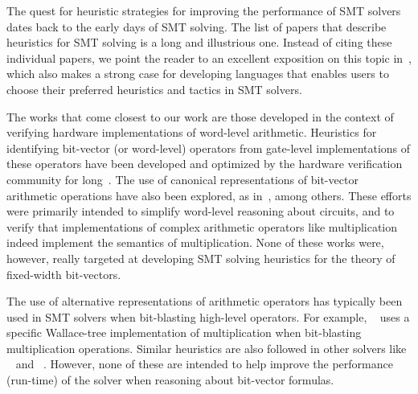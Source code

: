 


The quest for heuristic strategies for improving the performance of
SMT solvers dates back to the early days of SMT solving.  The list of
papers that describe heuristics for SMT solving is a long and
illustrious one.  Instead of citing these individual papers, we point
the reader to an excellent exposition on this topic
in~\cite{deMoura2013}, which also makes a strong case for developing
languages that enables users to choose their preferred heuristics and
tactics in SMT solvers.

The works that come closest to our work are those developed in the
context of verifying hardware implementations of word-level
arithmetic.  Heuristics for identifying bit-vector (or word-level)
operators from gate-level implementations of these operators have been
developed and optimized by the hardware verification community for
long~\cite{kunz,ciesielski,reveng,earlier-pat-match-synopsys}.  The
use of canonical representations of bit-vector arithmetic operations
have also been explored, as in~\cite{bmd,drechsler}, among others.
These efforts were primarily intended to simplify word-level reasoning
about circuits, and to verify that implementations of complex
arithmetic operators like multiplication indeed implement the
semantics of multiplication.  None of these works were, however,
really targeted at developing SMT solving heuristics for the theory of
fixed-width bit-vectors.

The use of alternative representations of arithmetic operators has
typically been used in SMT solvers when bit-blasting high-level
operators.  For example, {\zthree}~\cite{zthree} uses a specific
Wallace-tree implementation of multiplication when bit-blasting
multiplication operations.  Similar heuristics are also followed in
other solvers like {\boolector}~\cite{boolector} and
{\cvcfour}~\cite{cvcfour}.  However, none of these are intended to
help improve the performance (run-time) of the solver when reasoning
about bit-vector formulas. 
